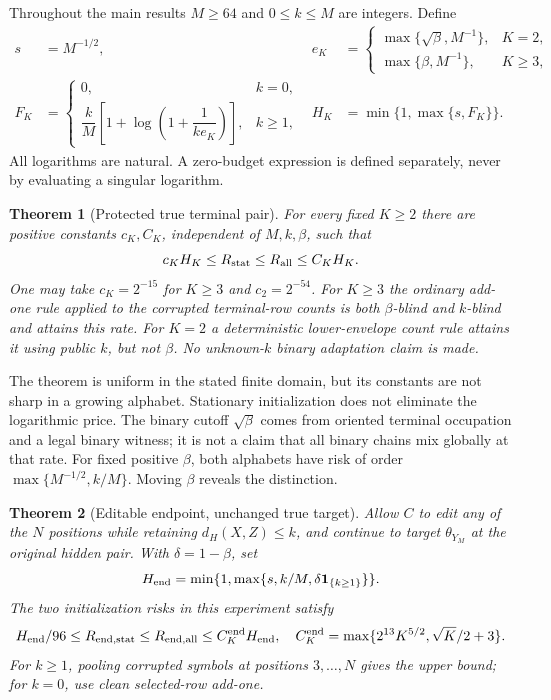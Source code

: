 \documentclass[11pt]{article}
\newtheorem{theorem}{Theorem}[section]
\theoremstyle{remark}\newtheorem{remark}[theorem]{Remark}
\newcommand{\1}{\mathbf 1}
\begin{document}
Throughout the main results $M\ge64$ and $0\le k\le M$ are integers. Define
\begin{align}
 s&=M^{-1/2},&
 e_K&=\begin{cases}\max\{\sqrt\beta,M^{-1}\},&K=2,\\
 \max\{\beta,M^{-1}\},&K\ge3,\end{cases}\label{eq:cutoff}\\
 F_K&=\begin{cases}0,&k=0,\\
 \dfrac{k}{M}\left[1+\log\left(1+\dfrac1{k e_K}\right)\right],&k\ge1,
 \end{cases}&
 H_K&=\min\{1,\max\{s,F_K\}\}.\label{eq:profile}
\end{align}
All logarithms are natural. A zero-budget expression is defined separately, never by evaluating a singular logarithm.

\begin{theorem}[Protected true terminal pair]\label{thm:main}
For every fixed $K\ge2$ there are positive constants $c_K,C_K$, independent of $M,k,\beta$, such that
\[
 c_K H_K\le R_{\rm stat}\le R_{\rm all}\le C_K H_K.
\]
One may take $c_K=2^{-15}$ for $K\ge3$ and $c_2=2^{-54}$. For $K\ge3$ the ordinary add-one rule applied to the corrupted terminal-row counts is both $\beta$-blind and $k$-blind and attains this rate. For $K=2$ a deterministic lower-envelope count rule attains it using public $k$, but not $\beta$. No unknown-$k$ binary adaptation claim is made.
\end{theorem}

The theorem is uniform in the stated finite domain, but its constants are not sharp in a growing alphabet. Stationary initialization does not eliminate the logarithmic price. The binary cutoff $\sqrt\beta$ comes from oriented terminal occupation and a legal binary witness; it is not a claim that all binary chains mix globally at that rate. For fixed positive $\beta$, both alphabets have risk of order $\max\{M^{-1/2},k/M\}$. Moving $\beta$ reveals the distinction.

\begin{theorem}[Editable endpoint, unchanged true target]\label{thm:endpoint-main}
Allow $C$ to edit any of the $N$ positions while retaining $d_H(X,Z)\le k$, and continue to target $\theta_{Y_M}$ at the original hidden pair. With $\delta=1-\beta$, set
\[
 H_{\rm end}=\min\{1,\max\{s,k/M,\delta\1_{\{k\ge1\}}\}\}.
\]
The two initialization risks in this experiment satisfy
\[
 H_{\rm end}/96\le R_{{\rm end},{\rm stat}}
 \le R_{{\rm end},{\rm all}}\le C_K^{\rm end}H_{\rm end},
 \quad C_K^{\rm end}=\max\{2^{13}K^{5/2},\sqrt K/2+3\}.
\]
For $k\ge1$, pooling corrupted symbols at positions $3,\ldots,N$ gives the upper bound; for $k=0$, use clean selected-row add-one.
\end{theorem}
\end{document}
